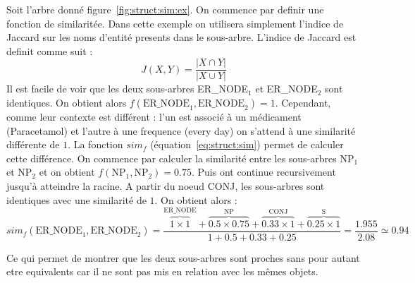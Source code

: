 \begin{example}
    Soit l'arbre donné figure~\ref{fig:struct:sim:ex}.
    On commence par definir une fonction de similaritée.
    Dans cette exemple on utilisera simplement l'indice de Jaccard \cite{jaccardDistributionFloreAlpine1901} sur les noms d'entité presents dans le sous-arbre.
    L'indice de Jaccard est definit comme suit :
    \[
        J(X, Y) = \frac{\lvert X \cap Y \rvert}{\lvert X \cup Y \rvert}
    \]
    Il est facile de voir que les deux sous-arbres ER\_NODE$_1$ et ER\_NODE$_2$ sont identiques.
    On obtient alors $f(\text{ER\_NODE}_1, \text{ER\_NODE}_2) = 1$.
    Cependant, comme leur contexte est différent : l'un est associé à un médicament (Paracetamol) et l'autre à une frequence (every day) on s'attend à une similarité différente de $1$.
    La fonction $sim_f$ (équation~\ref{eq:struct:sim}) permet de calculer cette différence.
    On commence par calculer la similarité entre les sous-arbres NP$_1$ et NP$_2$ et on obtient $f(\text{NP}_1, \text{NP}_2) = 0.75$.
    Puis ont continue recursivement jusqu'à atteindre la racine.
    A partir du noeud CONJ, les sous-arbres sont identiques avec une similarité de $1$.
    On obtient alors :
    \[
        sim_f(\text{ER\_NODE}_1, \text{ER\_NODE}_2) = \frac{\overbrace{1 \times 1}^{\text{ER\_NODE}} + \overbrace{0.5 \times 0.75}^{\text{NP}} + \overbrace{0.33 \times 1}^{\text{CONJ}} + \overbrace{0.25 \times 1}^{\text{S}}}{1 + 0.5 + 0.33 + 0.25} = \frac{1.955}{2.08} \simeq 0.94
    \]

    Ce qui permet de montrer que les deux sous-arbres sont proches sans pour autant etre equivalents car il ne sont pas mis en relation avec les mêmes objets.



\end{example}
